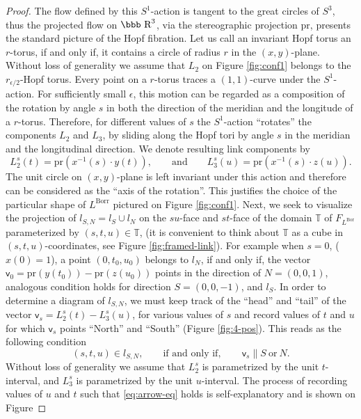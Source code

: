 \documentclass[12pt]{article}
\numberwithin{equation}{section}
\newcommand{\R}{\mbox{\bbb R}}       %
\newcommand{\no}{\noindent}
\begin{document}
\begin{proof}
\no The flow defined by this $S^1$-action is tangent to the great circles of $S^3$, thus 
the projected flow on $\R^3$, via the stereographic projection $\text{pr}$,
presents the standard picture of the Hopf fibration. Let us call an invariant Hopf torus an $r$-torus, if and only if, it contains a circle of radius $r$ in the $(x,y)$-plane. Without loss of generality we assume that $L_2$ on Figure \ref{fig:conf1} belongs to the $r_{\epsilon/2}$-Hopf torus.  
 Every point on a $r$-torus traces a
$(1,1)$-curve under the $S^1$-action. For sufficiently small $\epsilon$, this motion can be regarded 
as a composition of the rotation by angle $s$ in both the direction of the meridian
and the longitude of a $r$-torus.  Therefore, for different values of $s$ the $S^1$-action ``rotates'' the components $L_2$ and $L_3$, by sliding 
along the Hopf tori by angle $s$ in the meridian and the longitudinal
direction. We denote resulting link components by 
\[
 L^s_2(t)=\text{pr}(x^{-1}(s)\cdot y(t)),\qquad \text{and}\qquad  L^s_3(u)=\text{pr}(x^{-1}(s)\cdot z(u)).
\]
The  unit circle on $(x,y)$-plane is left invariant under this action and therefore can be considered as the ``axis of the rotation''. This justifies the choice of the particular shape of $L^\text{Borr}$ pictured on Figure \ref{fig:conf1}.
\no Next, we seek to visualize the projection of $l_{S,N}=l_S\cup l_N$ on the $su$-face and $st$-face of the domain $\mathbb{T}$ of $F_{L^\text{Bor}}$ parameterized by $(s,t,u)\in \mathbb{T}$, (it is convenient to  think about $\mathbb{T}$ as a cube in $(s,t,u)$-coordinates, see Figure \ref{fig:framed-link}). 
For example when $s=0$, ($x(0)=1$), a point
$(0,t_0,u_0)$ belongs to $l_N$, if and only if, the vector $\mathsf{v}_0=\text{pr}(y(t_0))-\text{pr}(z(u_0))$
points  in the direction of $N=(0,0,1)$, analogous condition holds for direction
$S=(0,0,-1)$, and $l_S$. In order to determine a diagram of $l_{S,N}$, we must keep track of the ``head'' and ``tail'' of the vector $\mathsf{v}_s=L^s_2(t)-L^s_3(u)$, for various values of $s$ and record values of $t$ and $u$
for which $\mathsf{v}_s$ points ``North'' and ``South''
(Figure \ref{fig:4-pos}). This reads as the following condition
\begin{equation}\label{eq:arrow-eq}
  (s,t,u)\in l_{S,N},\qquad\text{if and only if},\qquad \mathsf{v}_s \parallel S\ \text{or}\ N.
\end{equation}
Without loss of generality we assume that $L^{s}_2$ is parametrized by the unit $t$-interval, and $L^{s}_3$ is parametrized by the unit $u$-interval. 
The process of recording values of $u$ and $t$ such that \eqref{eq:arrow-eq} holds is self-explanatory and is shown on Figure

\end{proof}
\end{document}

